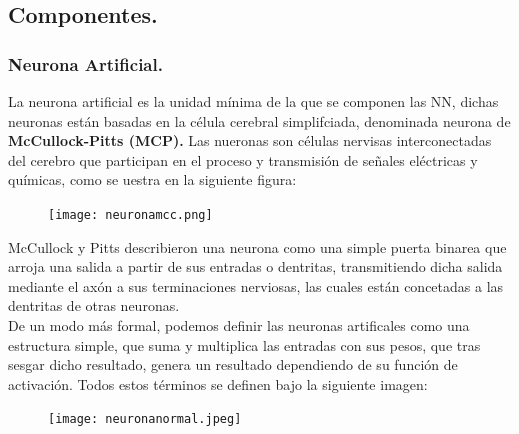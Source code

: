 \documentclass[a4paper,10pt]{article}
\begin{document}
\subsection{Componentes.}
\subsubsection{Neurona Artificial.}
La neurona artificial es la unidad mínima de la que se componen las NN, dichas neuronas están basadas en la célula cerebral simplifciada, denominada neurona de \textbf{McCullock-Pitts (MCP).} Las nueronas son células nervisas interconectadas del cerebro que participan en el proceso y transmisión de señales eléctricas y químicas, como se uestra en la siguiente figura: \\
\begin{figure}[H]
\centering
\texttt{[image: neuronamcc.png]}
\end{figure}
\noindent
McCullock y Pitts describieron una neurona como una simple puerta binarea que arroja una salida a partir de sus entradas o dentritas, transmitiendo dicha salida mediante el axón a sus terminaciones nerviosas, las cuales están concetadas a las dentritas de otras neuronas.\\
De un modo más formal, podemos definir las neuronas artificales como una estructura simple, que suma y multiplica las entradas con sus pesos, que tras sesgar dicho resultado, genera un resultado dependiendo de su función de activación. Todos estos términos se definen bajo la siguiente imagen:
\begin{figure}[H]
\centering
\texttt{[image: neuronanormal.jpeg]}
\end{figure}
\end{document}
